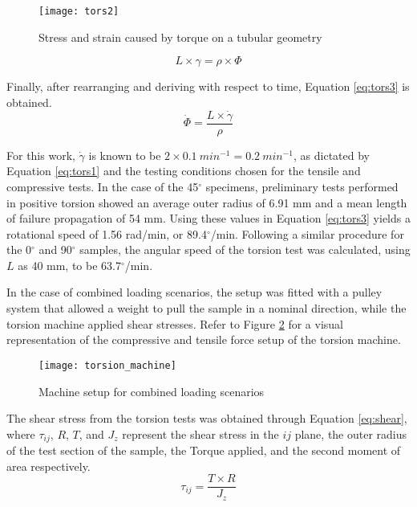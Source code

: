 \documentclass[main.tex]{subfiles}
\begin{document}
\begin{figure}[h]
	\center
	\texttt{[image: tors2]}
	\caption{Stress and strain caused by torque on a tubular geometry~\cite{Obst2018}} \label{fig:torscal}
\end{figure} 

\begin{equation}\label{eq:tors2}
L\times \gamma= \rho \times \Phi  
\end{equation}

Finally, after rearranging and deriving with respect to time, Equation \ref{eq:tors3} is obtained.
\begin{equation}\label{eq:tors3}
\dot{\Phi}=\frac{L\times\dot{\gamma}}{\rho}  
\end{equation}

For this work, $\dot{\gamma}$ is known to be $2 \times 0.1~min^{-1}= 0.2~min^{-1}$, as dictated by Equation \ref{eq:tors1} and the testing conditions chosen for the tensile and compressive tests. In the case of the 45$^\circ$ specimens, preliminary tests performed in positive torsion showed an average outer radius of 6.91 mm and a mean length of failure propagation of 54 mm. Using these values in Equation \ref{eq:tors3} yields a rotational speed of 1.56 rad/min, or 89.4$^\circ$/min. Following a similar procedure for the 0$^\circ$ and 90$^\circ$ samples, the angular speed of the torsion test was calculated, using $L$ as 40 mm, to be 63.7$^\circ$/min.%

In the case of combined loading scenarios, the setup was fitted with a pulley system that allowed a weight to pull the sample in a nominal direction, while the torsion machine applied shear stresses. Refer to Figure \ref{fig:torscomb} for a visual representation of the compressive and tensile force setup of the torsion machine. 

\begin{figure}[!htbp]
	\center
	\texttt{[image: torsion\_machine]}
	\caption{Machine setup for combined loading scenarios} \label{fig:torscomb}
\end{figure}

The shear stress from the torsion tests was obtained through Equation \ref{eq:shear}, where $\tau_{ij}$, $R$, $T$, and $J_{z}$ represent the shear stress in the $ij$ plane, the outer radius of the test section of the sample, the Torque applied, and the second moment of area respectively.
\begin{equation}\label{eq:shear}
\tau_{ij}=\frac{T\times R}{J_{z}}  
\end{equation}
\end{document}
